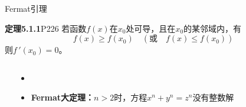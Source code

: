 \begin{frame}{Fermat引理}
	\linespread{1.2}\pause 
	\begin{block}{{\bf 定理5.1.1}\hfill P226}
		若函数$f(x)$在$x_0$处可导，且在$x_0$的某邻域内，有
		$$f(x)\geq f(x_0)\quad (\mbox{或}\quad f(x)\leq f(x_0))$$
		则$f\,'(x_0)=0$。
	\end{block}\pause 
	\begin{columns}
		\begin{center}
		\end{center}\pause 
			\begin{itemize}
			  \item {}\pause 
			  \item \alert{{\bf Fermat大定理：}}$n>2$时，方程$x^n+y^n=z^n$没有整数解
			\end{itemize}
	\end{columns}
\end{frame}

